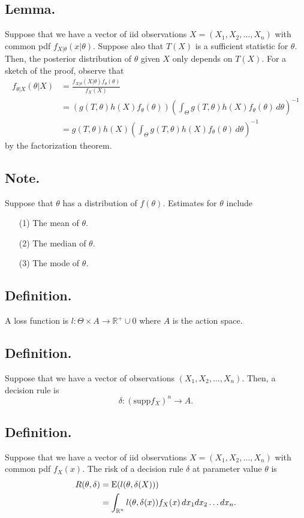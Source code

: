 \documentclass[titlepage]{article}
\begin{document}
\subsection{Lemma.} Suppose that we have a vector of iid observations $X = (X_{1}, X_{2}, \ldots, X_{n})$ with common pdf $f_{X|\theta}(x|\theta)$. Suppose also that $T(X)$ is a sufficient statistic for $\theta$. Then, the posterior distribution of $\theta$ given $X$ only depends on $T(X)$. For a sketch of the proof, observe that 
\begin{align*}
    f_{\theta|X}(\theta|X) &= \frac{f_{X|\theta}(X|\theta)f_{\theta}(\theta)}{f_{X}(X)} \\
                           &= (g(T, \theta)h(X)f_{\theta}(\theta))\left(\int_{\Theta}g(T, \theta)h(X)f_{\theta}(\theta)\, d\theta\right)^{-1} \\
                           &= g(T, \theta)h(X)\left(\int_{\Theta}g(T, \theta)h(X)f_{\theta}(\theta)\, d\theta\right)^{-1}
\end{align*}
by the factorization theorem.

\subsection{Note.} Suppose that $\theta$ has a distribution of $f(\theta)$. Estimates for $\theta$ include 
\begin{enumerate}
\item[(1)] The mean of $\theta$.
\item[(2)] The median of $\theta$.
\item[(3)] The mode of $\theta$.
\end{enumerate}

\subsection{Definition.} A loss function is $l: \Theta \times A \to \mathbb{R}^{+} \cup 0$ where $A$ is the action space.

\subsection{Definition.} Suppose that we have a vector of observations $(X_{1}, X_{2}, \ldots, X_{n})$. Then, a decision rule is 
$$\delta: (\text{supp} f_{X})^{n} \to A.$$

\subsection{Definition.} Suppose that we have a vector of iid observations $X = (X_{1}, X_{2}, \ldots, X_{n})$ with common pdf $f_{X}(x)$. The risk of a decision rule $\delta$ at parameter value $\theta$ is 
\begin{align*}
    R(\theta, \delta) &= \text{E}(l(\theta, \delta(X))) \\
                      &= \int_{\mathbb{R}^{n}}l(\theta, \delta(x))f_{X}(x)\, dx_{1}dx_{2}\ldots dx_{n}.
\end{align*}
\end{document}
